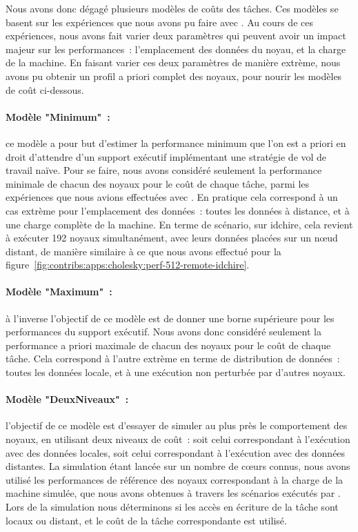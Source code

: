 Nous avons donc dégagé plusieurs modèles de coûts des tâches.
Ces modèles se basent sur les expériences que nous avons pu faire avec \outil.
Au cours de ces expériences, nous avons fait varier deux paramètres qui peuvent avoir un impact majeur sur les performances~: l'emplacement des données du noyau, et la charge de la machine.
En faisant varier ces deux paramètres de manière extrème, nous avons pu obtenir un profil a priori complet des noyaux, pour nourir les modèles de coût ci-dessous.

\paragraph{Modèle "Minimum"~:} ce modèle a pour but d'estimer la performance minimum que l'on est a priori en droit d'attendre d'un support exécutif implémentant une stratégie de vol de travail naïve.
Pour se faire, nous avons considéré seulement la performance minimale de chacun des noyaux pour le coût de chaque tâche, parmi les expériences que nous avions effectuées avec \outil.
En pratique cela correspond à un cas extrème pour l'emplacement des données~: toutes les données à distance, et à une charge complète de la machine.
En terme de scénario, sur idchire, cela revient à exécuter 192 noyaux simultanément, avec leurs données placées sur un nœud distant, de manière similaire à ce que nous avons effectué pour la figure~\ref{fig:contribs:apps:cholesky:perf-512-remote-idchire}.

\paragraph{Modèle "Maximum"~:} à l'inverse l'objectif de ce modèle est de donner une borne supérieure pour les performances du support exécutif.
Nous avons donc considéré seulement la performance a priori maximale de chacun des noyaux pour le coût de chaque tâche.
Cela correspond à l'autre extrème en terme de distribution de données~: toutes les données locale, et à une exécution non perturbée par d'autres noyaux.

\paragraph{Modèle "DeuxNiveaux"~:} l'objectif de ce modèle est d'essayer de simuler au plus près le comportement des noyaux, en utilisant deux niveaux de coût~: soit celui correspondant à l'exécution avec des données locales, soit celui correspondant à l'exécution avec des données distantes.
La simulation étant lancée sur un nombre de cœurs connus, nous avons utilisé les performances de référence des noyaux correspondant à la charge de la machine simulée, que nous avons obtenues à travers les scénarios exécutés par \outil.
Lors de la simulation nous déterminons si les accès en écriture de la tâche sont locaux ou distant, et le coût de la tâche correspondante est utilisé.




